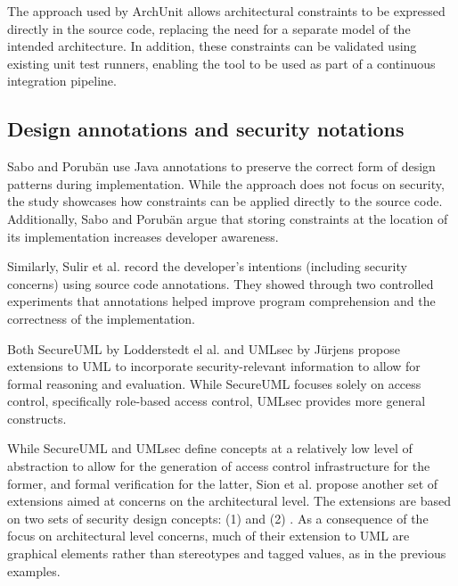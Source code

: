 The approach used by ArchUnit allows architectural constraints to be expressed directly in the source code, replacing the need for a separate model of the intended architecture. In addition, these constraints can be validated using existing unit test runners, enabling the tool to be used as part of a continuous integration pipeline.





\subsection{Design annotations and security notations}

Sabo and Porubän \cite{sabo_preserving_2009} use Java annotations to preserve the correct form of design patterns during implementation. While the approach does not focus on security, the study showcases how constraints can be applied directly to the source code. Additionally, Sabo and Porubän argue that storing constraints at the location of its implementation increases developer awareness. 

Similarly, Sulir et al. \cite{sulir_recording_2016} record the developer's intentions (including security concerns) using source code annotations. They showed through two controlled experiments that annotations helped improve program comprehension and the correctness of the implementation.

Both SecureUML by Lodderstedt el al. \cite{goos_secureuml_2002} and UMLsec by Jürjens \cite{goos_umlsec_2002} propose extensions to UML to incorporate security-relevant information to allow for formal reasoning and evaluation. While SecureUML focuses solely on access control, specifically role-based access control, UMLsec provides more general constructs.

While SecureUML and UMLsec define concepts at a relatively low level of abstraction to allow for the generation of access control infrastructure for the former, and formal verification for the latter, Sion et al. \cite{sion_masc_2015} propose another set of extensions aimed at concerns on the architectural level. The extensions are based on two sets of security design concepts: (1)  and (2) . As a consequence of the focus on architectural level concerns, much of their extension to UML are graphical elements rather than stereotypes and tagged values, as in the previous examples. 

